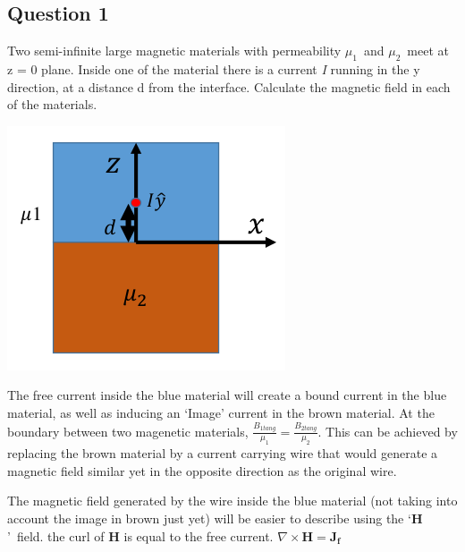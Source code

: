 \documentclass[a4paper,12pt]{article}
\begin{document}
\subsection*{Question 1}
Two semi-infinite large magnetic materials with permeability $\mu_1$\ and $\mu_2$\  meet at z = 0 plane.  Inside one of the material there is a current \textit{I} running in the y direction, at a distance d from the interface.  Calculate the magnetic field in each of the materials.

\includegraphics{Magnetic_Image.png}

The free current inside the blue material will create a bound current in the blue material, as well as inducing an `Image' current in the brown material.  At the boundary between two magenetic materials, $\frac{B_{1tang}}{\mu_1}=\frac{B_{2tang}}{\mu_2}$.  This can be achieved by replacing the brown material by a current carrying wire that would generate a magnetic field similar yet in the opposite direction as the original wire. 

 The magnetic field generated by the wire inside the blue material (not taking into account the image in brown just yet) will be easier to describe using the `$\mathbf{H}$'\ field.  the curl of \textbf{H} is equal to the free current. $\nabla \times \mathbf{H}=\mathbf{J_f}$
\end{document}
